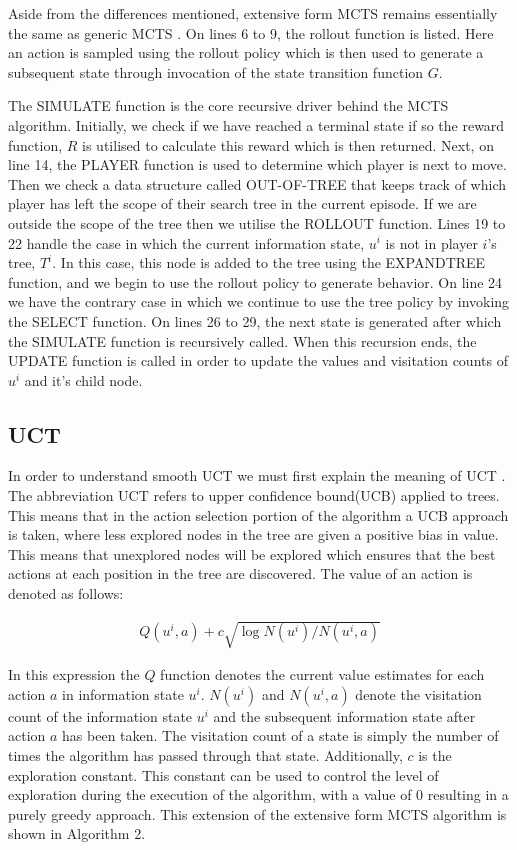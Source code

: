 Aside from the differences mentioned, extensive form MCTS remains essentially the same as generic MCTS .
On lines 6 to 9, the rollout function is listed.
Here an action is sampled using the rollout policy which is then used to generate a subsequent
state through invocation of the state transition function $G$.

The SIMULATE function is the core recursive driver behind the MCTS algorithm.
Initially, we check if we have reached a terminal state if so the reward function,
$R$ is utilised to calculate this reward which is then returned.
Next, on line 14, the PLAYER function is used to determine which player is next to move.
Then we check a data structure called OUT-OF-TREE that keeps track of which player has
left the scope of their search tree in the current episode\citep{heinrich2017reinforcement}.
If we are outside the scope of the tree then we utilise the ROLLOUT function.
Lines 19 to 22 handle the case in which the current information state, $u^i$ is
not in player $i$'s tree, $T^i$.
In this case, this node is added to the tree using the EXPANDTREE function, and we begin
to use the rollout policy to generate behavior.
On line 24 we have the contrary case in which we continue to use the tree policy by
invoking the SELECT function.
On lines 26 to 29, the next state is generated after which the SIMULATE function is recursively
called.
When this recursion ends, the UPDATE function is called in order to update the
values and visitation counts of $u^{i}$ and it's child node.


\subsection{UCT}\label{subsec:UCT}
In order to understand smooth UCT we must first explain the meaning of UCT .
The abbreviation UCT refers to upper confidence bound(UCB) applied to trees.
This means that in the action selection portion of the algorithm a UCB approach
is taken, where less explored nodes in the tree are given a positive bias in value.
This means that unexplored nodes will be explored which ensures that
the best actions at each position in the tree are discovered.
The value of an action is denoted as follows:

\begin{align}
    Q(u^i, a) + c \sqrt{\log N(u^i) / N(u^i, a)}
\end{align}

In this expression the $Q$ function denotes the current value estimates for each action $a$
in information state $u^i$.
$N(u^i)$ and $N(u^i, a)$ denote the visitation count of the information state $u^i$
and the subsequent information state after action $a$ has been taken.
The visitation count of a state is simply the number of times the algorithm has passed
through that state.
Additionally, $c$ is the exploration constant.
This constant can be used to control the level of exploration during the execution of the algorithm,
with a value of 0 resulting in a purely greedy approach.
This extension of the extensive form MCTS algorithm is shown in Algorithm 2.

